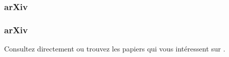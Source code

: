 \begin{frame}
  \frametitle{arXiv}
\end{frame}

\begin{frame}
  \frametitle{arXiv}
  Consultez  directement ou trouvez les papiers qui vous intéressent sur .
\end{frame}
